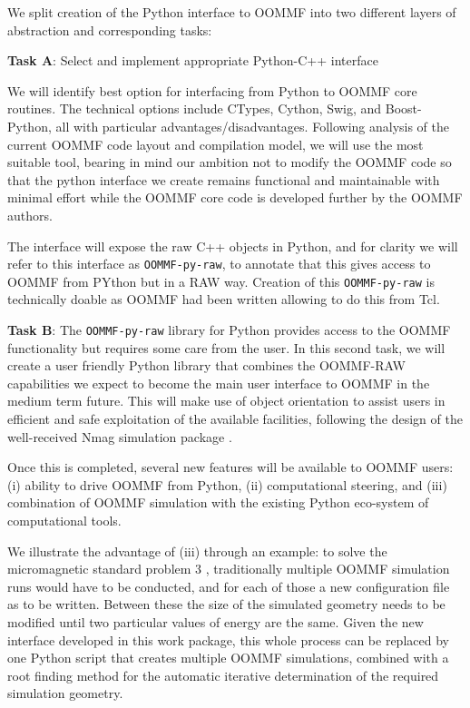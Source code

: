 \begin{workpackage}[id=UI,wphases=24-48,
  title=User Interfaces,
  PSRM=1,
  JURM=12, %
  LLRM=1, %
  SARM=1, %
  UKRM=1, %
  UBRM=1, %
  USORM=25]
\begin{tasklist}
\begin{task}[id=oommf-python-interface,title=OOMMF case study: Create Python interface to OOMMF code]
  We split creation of the Python interface to OOMMF into two
  different layers of abstraction and corresponding tasks:

  \textbf{Task A}: Select and implement appropriate Python-C++ interface

  We will identify best option for interfacing from Python to OOMMF
  core routines. The technical options include CTypes, Cython, Swig,
  and Boost-Python, all with particular
  advantages/disadvantages. Following analysis of the current OOMMF
  code layout and compilation model, we will use the most suitable
  tool, bearing in mind our ambition not to modify the OOMMF code so
  that the python interface we create remains functional and
  maintainable with minimal effort while the OOMMF core code is
  developed further by the OOMMF authors.

  The interface will expose the raw C++ objects in Python, and for
  clarity we will refer to this interface as \texttt{OOMMF-py-raw}, to
  annotate that this gives access to OOMMF from PYthon but in a RAW
  way. Creation of this \texttt{OOMMF-py-raw} is technically doable as
  OOMMF had been written allowing to do this from Tcl.

  \textbf{Task B}: The \texttt{OOMMF-py-raw} library for Python
  provides access to the OOMMF functionality but requires some care
  from the user. In this second task, we will create a user friendly
  Python library that combines the OOMMF-RAW capabilities we expect to
  become the main user interface to OOMMF in the medium term
  future. This will make use of object orientation to assist users in
  efficient and safe exploitation of the available facilities,
  following the design of the well-received Nmag simulation package
  \cite{Nmag-url}.


  Once this is completed, several new features will be available to
  OOMMF users: (i) ability to drive OOMMF from Python, (ii)
  computational steering, and (iii) combination of OOMMF simulation
  with the existing Python eco-system of computational tools.


  We illustrate the advantage of (iii) through an example: to solve
  the micromagnetic standard problem 3
  \cite{Micromagnetic-Standardproblem-3}, traditionally multiple OOMMF
  simulation runs would have to be conducted, and for each of those a
  new configuration file as to be written. Between these the size of
  the simulated geometry needs to be modified until two particular
  values of energy are the same. Given the new interface developed in
  this work package, this whole process can be replaced by one Python
  script that creates multiple OOMMF simulations, combined with a root
  finding method for the automatic iterative determination of the
  required simulation geometry.


\end{task}
\end{tasklist}
\end{workpackage}
